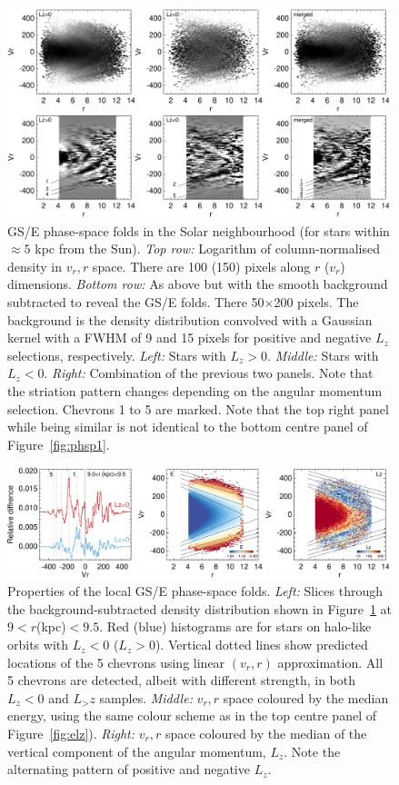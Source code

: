 \documentclass[a4paper,useAMS,usenatbib]{mnras}
\begin{document}
%
\begin{figure}
  \centering
  \includegraphics[width=0.99\textwidth]{img/phase_space_fig2.pdf}
  \caption[]{GS/E phase-space folds in the Solar neighbourhood (for stars within $\approx5$ kpc from the Sun). {\it Top row:} Logarithm of column-normalised density in $v_r,r$ space. There are 100 (150) pixels along $r$ ($v_r$) dimensions. {\it Bottom row:} As above but with the smooth background subtracted to reveal the GS/E folds. There 50$\times$200 pixels. The background is the density distribution convolved with a Gaussian kernel with a FWHM of 9 and 15 pixels for positive and negative $L_z$ selections, respectively. {\it Left:} Stars with $L_z>0$. {\it Middle:} Stars with $L_z<0$. {\it Right:} Combination of the previous two panels. Note that the striation pattern changes depending on the angular momentum selection. Chevrons 1 to 5 are marked. Note that the top right panel while being similar is not identical to the bottom centre panel of Figure~\ref{fig:phsp1}.}
   \label{fig:phsp2}
\end{figure}
%

%
\begin{figure}
  \centering
  \includegraphics[width=0.99\textwidth]{img/phase_space_fig3.pdf}
  \caption[]{Properties of the local GS/E phase-space folds. {\it Left:} Slices through the background-subtracted density distribution shown in Figure~\ref{fig:phsp2} at $9<r$(kpc)$<9.5$. Red (blue) histograms are for stars on halo-like orbits with $L_z<0$ ($L_z>0$). Vertical dotted lines show predicted locations of the 5 chevrons using linear $(v_r,r)$ approximation. All 5 chevrons are detected, albeit with different strength, in both $L_z<0$ and $L_>z$ samples. {\it Middle:} $v_r, r$ space coloured by the median energy, using the same colour scheme as in the top centre panel of Figure~\ref{fig:elz}). {\it Right:} $v_r, r$ space coloured by the median of the vertical component of the angular momentum, $L_z$. Note the alternating pattern of positive and negative $L_z$.}
   \label{fig:phsp3}
\end{figure}
%
\end{document}

